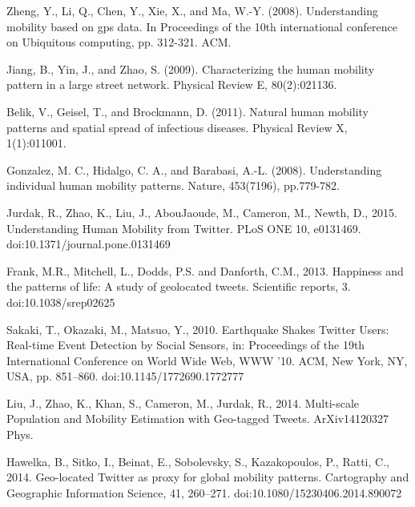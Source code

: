 \documentclass[a4paper,11pt]{article}
\begin{document}
\begin{thebibliography}{10}
Zheng, Y., Li, Q., Chen, Y., Xie, X., and Ma, W.-Y. (2008). Understanding mobility based on gps data. In Proceedings of the 10th international conference on Ubiquitous computing, pp. 312-321. ACM.

Jiang, B., Yin, J., and Zhao, S. (2009). Characterizing the human mobility pattern in a large street network. Physical Review E, 80(2):021136.

Belik, V., Geisel, T., and Brockmann, D. (2011). Natural human mobility patterns and spatial spread of infectious diseases. Physical Review X, 1(1):011001.

Gonzalez, M. C., Hidalgo, C. A., and Barabasi, A.-L. (2008). Understanding individual human mobility patterns. Nature, 453(7196), pp.779-782.

Jurdak, R., Zhao, K., Liu, J., AbouJaoude, M., Cameron, M., Newth, D., 2015. Understanding Human Mobility from Twitter. PLoS ONE 10, e0131469. doi:10.1371/journal.pone.0131469

Frank, M.R., Mitchell, L., Dodds, P.S. and Danforth, C.M., 2013. Happiness and the patterns of life: A study of geolocated tweets. Scientific reports, 3. doi:10.1038/srep02625



Sakaki, T., Okazaki, M., Matsuo, Y., 2010. Earthquake Shakes Twitter Users: Real-time Event Detection by Social Sensors, in: Proceedings of the 19th International Conference on World Wide Web, WWW ’10. ACM, New York, NY, USA, pp. 851–860. doi:10.1145/1772690.1772777

Liu, J., Zhao, K., Khan, S., Cameron, M., Jurdak, R., 2014. Multi-scale Population and Mobility Estimation with Geo-tagged Tweets. ArXiv14120327 Phys.


Hawelka, B., Sitko, I., Beinat, E., Sobolevsky, S., Kazakopoulos, P., Ratti, C., 2014. Geo-located Twitter as proxy for global mobility patterns. Cartography and Geographic Information Science, 41, 260–271. doi:10.1080/15230406.2014.890072




\end{thebibliography}
\end{document}
